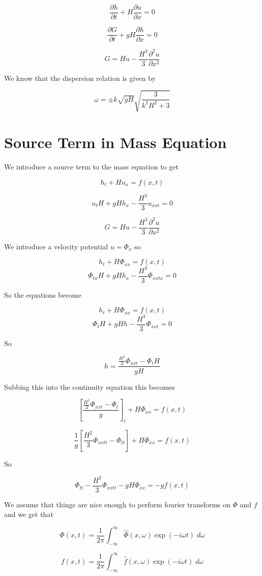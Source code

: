 \documentclass[12pt]{article}
\begin{document}
\[\frac{\partial  h}{\partial  t} + H\frac{\partial  u}{\partial  x} = 0 \]

\[\frac{\partial  G}{\partial  t} + gH\frac{\partial  h}{\partial  x}   = 0 \]

\[G = Hu -\frac{H^3}{3} \frac{\partial^2 u}{\partial x^2}\]

We know that the dispersion relation is given by

\[\omega =  \pm k\sqrt{gH}\sqrt{\frac{3}{k^2H^2 + 3}}\]

\section{Source Term in Mass Equation}

We introduce a source term to the mass equation to get

\[h_t + Hu_x = f(x,t) \]

\[u_tH + gHh_x - \frac{H^3}{3} u_{xxt}   = 0 \]

\[G = Hu -\frac{H^3}{3} \frac{\partial^2 u}{\partial x^2}\]

We introduce a velocity potential $u = \Phi_x$ so

\[h_t + H\Phi_{xx} = f(x,t) \]
\[\Phi_{tx}H + gHh_x - \frac{H^3}{3} \Phi_{xxtx}   = 0 \]

So the equations become

\[h_t + H\Phi_{xx} = f(x,t) \]
\[\Phi_{t}H + gHh - \frac{H^3}{3} \Phi_{xxt}   = 0 \]

So

\[h = \frac{\frac{H^3}{3} \Phi_{xxt} - \Phi_{t}H}{gH} \]

Subbing this into the continuity equation this becomes

\[\left[\frac{\frac{H^2}{3} \Phi_{xxt} - \Phi_{t}}{g}\right]_t + H\Phi_{xx} = f(x,t) \]

\[\frac{1}{g}\left[{\frac{H^2}{3} \Phi_{xxtt} - \Phi_{tt}}\right]+ H\Phi_{xx} = f(x,t) \]

So 

\[ \Phi_{tt} - \frac{H^2}{3} \Phi_{xxtt} - gH\Phi_{xx} = -gf(x,t) \]

We assume that things are nice enough to perform fourier transforms on $\Phi$ and $f$ and we get that

\[\Phi(x,t) = \frac{1}{2 \pi} \int_{-\infty}^{\infty} \hat{\Phi}(x,\omega) \exp\left(-i\omega t\right) \; d\omega\]

\[f(x,t) = \frac{1}{2 \pi} \int_{-\infty}^{\infty} \hat{f}(x,\omega) \exp\left(-i\omega t\right) \; d\omega\]
\end{document}

